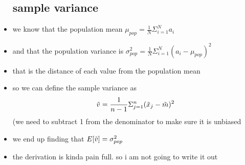 \documentclass{article}
\begin{document}
\begin{itemize}
\subsection{sample variance}
\item we know that the population mean $\mu_{pop}=\frac{1}{N}\Sigma_{i=1}^{N}a_i$
\item and that the population variance is $\sigma_{pop}^{2}=\frac{1}{N}\Sigma_{i=1}^{N}(a_i-\mu_{pop})^{2}$
\item that is the distance of each value from the population mean 
\item so we can define the sample variance as $$\Tilde{v}=\frac{1}{n-1}\Sigma_{j=1}^{n}(\Tilde{x}_j-\Tilde{m})^{2}$$ (we need to subtract 1 from the denominator to make sure it is unbiased
\item we end up finding that $E[\Tilde{v}]=\sigma_{pop}^{2}$
\item the derivation is kinda pain full. so i am not going to write it out 
\end{itemize}
\end{document}
